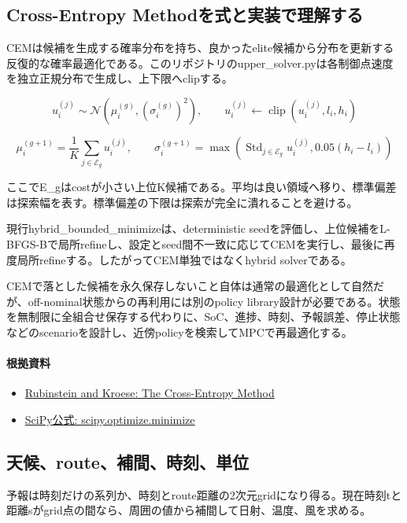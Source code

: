 \documentclass[a4paper,11pt]{article}
\begin{document}
\subsection{Cross-Entropy Methodを式と実装で理解する}
CEMは候補を生成する確率分布を持ち、良かったelite候補から分布を更新する反復的な確率最適化である。このリポジトリのupper\_solver.pyは各制御点速度を独立正規分布で生成し、上下限へclipする。


\[
u_i^{(j)} \sim \mathcal{N}(\mu_i^{(g)},(\sigma_i^{(g)})^2),\qquad u_i^{(j)}\leftarrow\operatorname{clip}(u_i^{(j)},l_i,h_i)
\]

\[
\mu_i^{(g+1)}=\frac{1}{K}\sum_{j\in\mathcal{E}_g}u_i^{(j)},\qquad \sigma_i^{(g+1)}=\max\left(\operatorname{Std}_{j\in\mathcal{E}_g}u_i^{(j)},0.05(h_i-l_i)\right)
\]

ここでE\_gはcostが小さい上位K候補である。平均は良い領域へ移り、標準偏差は探索幅を表す。標準偏差の下限は探索が完全に潰れることを避ける。


現行hybrid\_bounded\_minimizeは、deterministic seedを評価し、上位候補をL-BFGS-Bで局所refineし、設定とseed間不一致に応じてCEMを実行し、最後に再度局所refineする。したがってCEM単独ではなくhybrid solverである。


CEMで落とした候補を永久保存しないこと自体は通常の最適化として自然だが、off-nominal状態からの再利用には別のpolicy library設計が必要である。状態を無制限に全組合せ保存する代わりに、SoC、進捗、時刻、予報誤差、停止状態などのscenarioを設計し、近傍policyを検索してMPCで再最適化する。

\paragraph{根拠資料}
\begin{itemize}[leftmargin=1.6em]
\item \href{https://link.springer.com/book/10.1007/978-1-4757-4321-0}{Rubinstein and Kroese: The Cross-Entropy Method}
\item \href{https://docs.scipy.org/doc/scipy/reference/generated/scipy.optimize.minimize.html}{SciPy公式: scipy.optimize.minimize}
\end{itemize}

\subsection{天候、route、補間、時刻、単位}
予報は時刻だけの系列か、時刻とroute距離の2次元gridになり得る。現在時刻tと距離sがgrid点の間なら、周囲の値から補間して日射、温度、風を求める。
\end{document}
